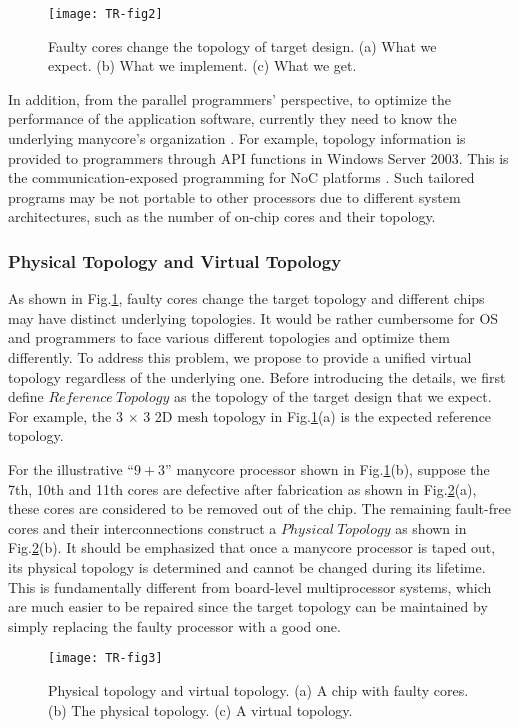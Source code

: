 \begin{figure}[t]
    \centering
        \texttt{[image: TR-fig2]}
          \caption{ Faulty cores change the topology of target design. (a) What we expect.
          (b) What we implement. (c) What we get.}
             \label{fig2}
\end{figure}

In addition, from the parallel programmers’ perspective, to optimize the performance of the application software, currently they need to know the underlying manycore’s organization \cite{patterson2016computer}. For example, topology information is provided to programmers through API functions in Windows Server 2003. This is the communication-exposed programming for NoC platforms \cite{de2008networks}. Such tailored programs may be not portable to other processors due to different system architectures, such as the number of on-chip cores and their topology.

\subsubsection{Physical Topology and Virtual Topology}
As shown in Fig.\ref{fig2}, faulty cores change the target topology and different chips may have distinct underlying topologies. It would be rather cumbersome for OS and programmers to face various different topologies and optimize them differently. To address this problem, we propose to provide a unified virtual topology regardless of the underlying one. Before introducing the details, we first define $Reference\ Topology$ as the topology of the target design that we expect. For example, the 3 $\times$ 3 2D mesh topology in Fig.\ref{fig2}(a) is the expected reference topology.

For the illustrative “$9+3$” manycore processor shown in Fig.\ref{fig2}(b), suppose the 7th, 10th and 11th cores are defective after fabrication as shown in Fig.\ref{fig3}(a), these cores are considered to be removed out of the chip. The remaining fault-free cores and their interconnections construct a $Physical\ Topology$ as shown in Fig.\ref{fig3}(b). It should be emphasized that once a manycore processor is taped out, its physical topology is determined and cannot be changed during its lifetime. This is fundamentally different from board-level multiprocessor systems, which are much easier to be repaired since the target topology can be maintained by simply replacing the faulty processor with a good one.

\begin{figure}[t]
    \centering
        \texttt{[image: TR-fig3]}
          \caption{ Physical topology and virtual topology. (a) A chip with faulty cores.
          (b) The physical topology. (c) A virtual topology.}
             \label{fig3}
\end{figure}


